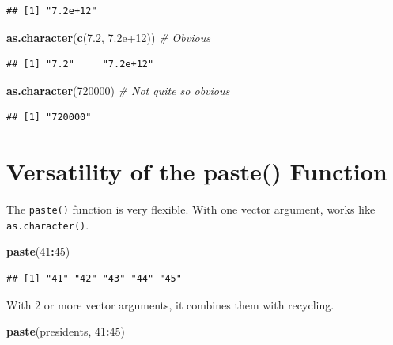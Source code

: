 \documentclass[
]{book}
\newenvironment{Shaded}{\begin{snugshade}}{\end{snugshade}}
\newcommand{\CommentTok}[1]{\textcolor[rgb]{0.56,0.35,0.01}{\textit{#1}}}
\newcommand{\DecValTok}[1]{\textcolor[rgb]{0.00,0.00,0.81}{#1}}
\newcommand{\FloatTok}[1]{\textcolor[rgb]{0.00,0.00,0.81}{#1}}
\newcommand{\KeywordTok}[1]{\textcolor[rgb]{0.13,0.29,0.53}{\textbf{#1}}}
\newcommand{\NormalTok}[1]{#1}
\newcommand{\OperatorTok}[1]{\textcolor[rgb]{0.81,0.36,0.00}{\textbf{#1}}}
\begin{document}
\begin{verbatim}
## [1] "7.2e+12"
\end{verbatim}

\begin{Shaded}
\begin{Highlighting}[]
\KeywordTok{as.character}\NormalTok{(}\KeywordTok{c}\NormalTok{(}\FloatTok{7.2}\NormalTok{, }\FloatTok{7.2e+12}\NormalTok{))  }\CommentTok{# Obvious}
\end{Highlighting}
\end{Shaded}

\begin{verbatim}
## [1] "7.2"     "7.2e+12"
\end{verbatim}

\begin{Shaded}
\begin{Highlighting}[]
\KeywordTok{as.character}\NormalTok{(}\DecValTok{720000}\NormalTok{)  }\CommentTok{# Not quite so obvious}
\end{Highlighting}
\end{Shaded}

\begin{verbatim}
## [1] "720000"
\end{verbatim}

\hypertarget{versatility-of-the-paste-function}{%
\section{Versatility of the paste() Function}\label{versatility-of-the-paste-function}}

The \texttt{paste()} function is very flexible. With one vector argument, works like \texttt{as.character()}.

\begin{Shaded}
\begin{Highlighting}[]
\KeywordTok{paste}\NormalTok{(}\DecValTok{41}\OperatorTok{:}\DecValTok{45}\NormalTok{)}
\end{Highlighting}
\end{Shaded}

\begin{verbatim}
## [1] "41" "42" "43" "44" "45"
\end{verbatim}

With 2 or more vector arguments, it combines them with recycling.

\begin{Shaded}
\begin{Highlighting}[]
\KeywordTok{paste}\NormalTok{(presidents, }\DecValTok{41}\OperatorTok{:}\DecValTok{45}\NormalTok{)}
\end{Highlighting}
\end{Shaded}
\end{document}

